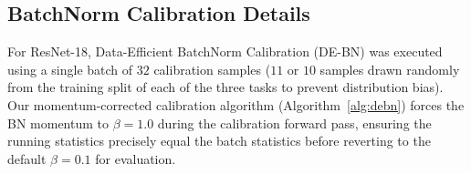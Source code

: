 \documentclass{article}
\theoremstyle{plain}
\theoremstyle{definition}
\theoremstyle{remark}
\begin{document}
\subsection{BatchNorm Calibration Details}
For ResNet-18, Data-Efficient BatchNorm Calibration (DE-BN) was executed using a single batch of $32$ calibration samples ($11$ or $10$ samples drawn randomly from the training split of each of the three tasks to prevent distribution bias). Our momentum-corrected calibration algorithm (Algorithm~\ref{alg:debn}) forces the BN momentum to $\beta = 1.0$ during the calibration forward pass, ensuring the running statistics precisely equal the batch statistics before reverting to the default $\beta = 0.1$ for evaluation.
\end{document}
